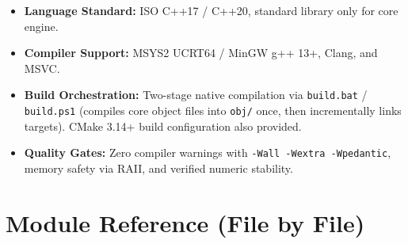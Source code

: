 \documentclass[11pt,a4paper]{article}
\begin{document}
\begin{itemize}[itemsep=2pt]
    \item \textbf{Language Standard:} ISO C++17 / C++20, standard library only for core engine.
    \item \textbf{Compiler Support:} MSYS2 UCRT64 / MinGW g++ 13+, Clang, and MSVC.
    \item \textbf{Build Orchestration:} Two-stage native compilation via \texttt{build.bat} / \texttt{build.ps1} (compiles core object files into \texttt{obj/} once, then incrementally links targets). CMake 3.14+ build configuration also provided.
    \item \textbf{Quality Gates:} Zero compiler warnings with \texttt{-Wall -Wextra -Wpedantic}, memory safety via RAII, and verified numeric stability.
\end{itemize}

\newpage
\section{Module Reference (File by File)}
\end{document}
